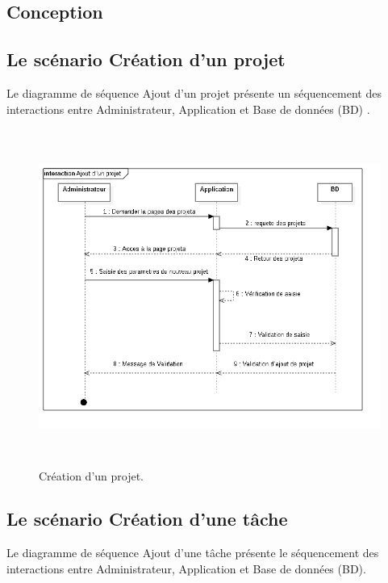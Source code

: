 \subsection{Conception}
\subsection{  Le sc\'{e}nario \guillemotleft{} Cr\'{e}ation d'un projet \guillemotright{}}

Le diagramme de s\'{e}quence \guillemotleft{} Ajout d'un projet \guillemotright{} pr\'{e}sente un s\'{e}quencement
des interactions entre Administrateur, Application et Base de donn\'{e}es (BD) .


\begin{figure}[H]
\center
\includegraphics[width=14cm,height=11cm]{./figures/seq/B.png}
\caption{ Cr\'{e}ation d'un projet.}
\end{figure}

\newpage
\subsection{Le sc\'{e}nario \guillemotleft{} Cr\'{e}ation d'une t\^{a}che\guillemotright{}}
Le diagramme de s\'{e}quence \guillemotleft{} Ajout d'une t\^{a}che \guillemotright{} pr\'{e}sente le s\'{e}quencement
des interactions entre Administrateur, Application et Base de donn\'{e}es (BD).

